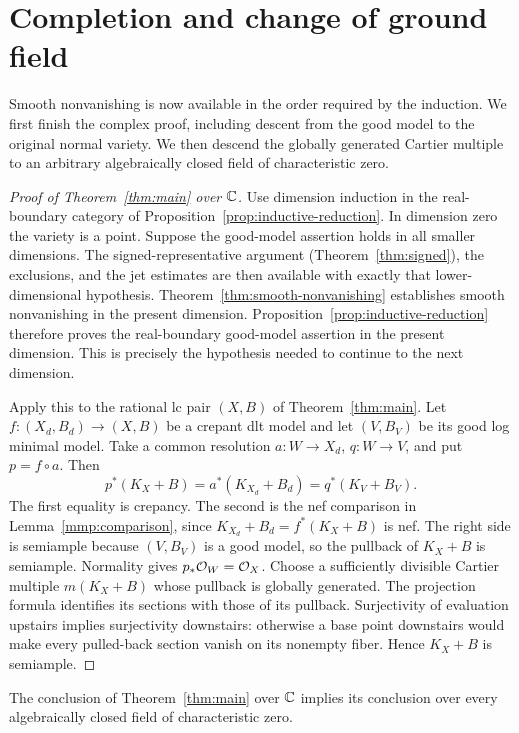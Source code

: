 \section{Completion and change of ground field}\label{sec:completion}

Smooth nonvanishing is now available in the order required by the
induction. We first finish the complex proof, including descent from
the good model to the original normal variety. We then descend the
globally generated Cartier multiple to an arbitrary algebraically
closed field of characteristic zero.

\begin{proof}[Proof of Theorem~\ref{thm:main} over \(\mathbb{C}\)]
Use dimension induction in the real-boundary category of
Proposition~\ref{prop:inductive-reduction}. In dimension zero the
variety is a point. Suppose the good-model assertion holds in all
smaller dimensions. The signed-representative argument
(Theorem~\ref{thm:signed}), the exclusions, and the jet estimates are
then available with exactly that lower-dimensional hypothesis.
Theorem~\ref{thm:smooth-nonvanishing} establishes smooth
nonvanishing in the present dimension. Proposition~\ref{prop:inductive-reduction}
therefore proves the real-boundary good-model assertion in the
present dimension. This is precisely the hypothesis needed to
continue to the next dimension.

Apply this to the rational lc pair \((X,B)\) of
Theorem~\ref{thm:main}. Let \(f:(X_d,B_d)\to(X,B)\) be a crepant dlt
model and let \((V,B_V)\) be its good log minimal model. Take a common
resolution \(a:W\to X_d\), \(q:W\to V\), and put \(p=f\circ a\).
Then
\[
 p^*(K_X+B)=a^*(K_{X_d}+B_d)=q^*(K_V+B_V).
\]
The first equality is crepancy. The second is the nef comparison in
Lemma~\ref{mmp:comparison}, since \(K_{X_d}+B_d=f^*(K_X+B)\) is nef.
The right side is semiample because \((V,B_V)\) is a good model, so
the pullback of \(K_X+B\) is semiample. Normality gives
\(p_*\mathcal{O}_W=\mathcal{O}_X\). Choose a sufficiently divisible Cartier multiple
\(m(K_X+B)\) whose pullback is globally generated. The projection
formula identifies its sections with those of its pullback.
Surjectivity of evaluation upstairs implies surjectivity downstairs:
otherwise a base point downstairs would make every pulled-back
section vanish on its nonempty fiber. Hence \(K_X+B\) is semiample.
\end{proof}

\begin{proposition}\label{prop:field-descent}
The conclusion of Theorem~\ref{thm:main} over \(\mathbb{C}\) implies its
conclusion over every algebraically closed field of characteristic zero.
\end{proposition}

